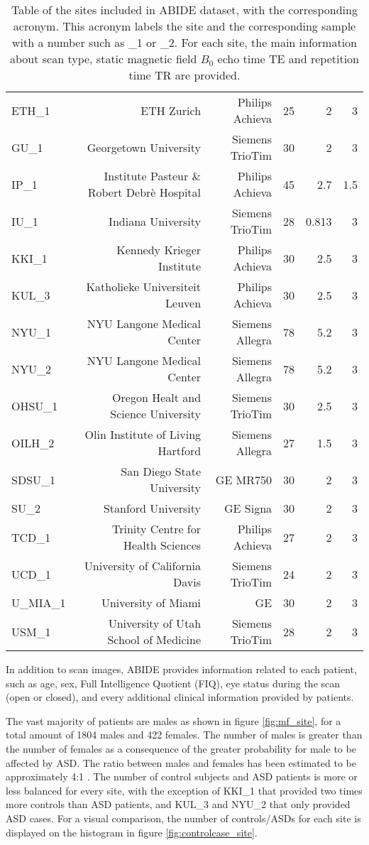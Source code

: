 \documentclass[11pt]{report}
\begin{document}
\begin{table}[!htp]
\begin{tabular}{lrrrrr}
ETH\_1 & ETH Zurich &Philips Achieva &25 &2 &3 \\
GU\_1 &Georgetown University &Siemens TrioTim &30 &2 &3 \\
IP\_1 &Institute Pasteur \& Robert Debrè Hospital &Philips Achieva &45 &2.7 &1.5 \\
IU\_1 &Indiana University &Siemens TrioTim &28 &0.813 &3 \\
KKI\_1 &Kennedy Krieger Institute &Philips Achieva &30 &2.5 &3 \\
KUL\_3 &Katholieke Universiteit Leuven &Philips Achieva &30 &2.5 &3 \\
NYU\_1 &NYU Langone Medical Center &Siemens Allegra &78 &5.2 &3 \\
NYU\_2 &NYU Langone Medical Center &Siemens Allegra &78 &5.2 &3 \\
OHSU\_1 &Oregon Healt and Science University &Siemens TrioTim &30 &2.5 &3 \\
OILH\_2 &Olin Institute of Living Hartford &Siemens Allegra &27 &1.5 &3 \\
SDSU\_1 &San Diego State University &GE MR750 &30 &2 &3 \\
SU\_2 &Stanford University &GE Signa &30 &2 &3 \\
TCD\_1 &Trinity Centre for Health Sciences &Philips Achieva &27 &2 &3 \\
UCD\_1 &University of California Davis &Siemens TrioTim &24 &2 &3 \\
U\_MIA\_1 &University of Miami &GE &30 &2 &3 \\
USM\_1 &University of Utah School of Medicine &Siemens TrioTim &28 &2 &3 \\
\bottomrule
\end{tabular}
\caption{Table of the sites included in ABIDE dataset, with the corresponding acronym.
This acronym labels the site and the corresponding sample with a number such as \_1 or \_2.
For each site, the main information about scan type, static magnetic field $B_0$ echo time TE and repetition time TR are provided.}\label{tab:scan_sites}
\end{table}






In addition to scan images, ABIDE provides information related to each patient, such as age, sex, Full Intelligence Quotient (FIQ), eye status during the scan (open or closed), and every additional clinical information provided by patients.

The vast majority of patients are males as shown in figure \ref{fig:mf_site}, for a total amount of 1804 males and 422 females.
The number of males is greater than the number of females as a consequence of the greater probability for male to be affected by ASD. The ratio between males and females has been estimated to be approximately 4:1 \cite{fombonne2009}.
The number of control subjects and ASD patients is more or less balanced for every site, with the exception of KKI\_1 that provided two times more controls than ASD patients, and KUL\_3 and NYU\_2 that only provided ASD cases. 
For a visual comparison, the number of controls/ASDs for each site is displayed on the histogram in figure \ref{fig:controlcase_site}.
\end{document}
